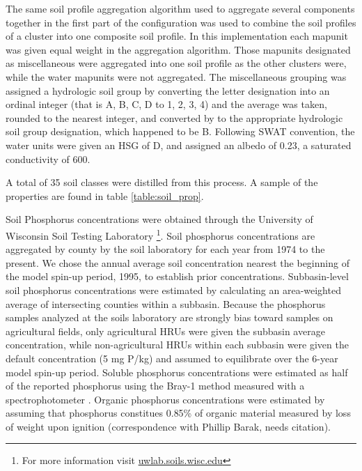 The same soil profile aggregation algorithm \citep{beaudette_algorithms_2013} used to aggregate several components together in the first part of the configuration was used to combine the soil profiles of a cluster into one composite soil profile. In this implementation each mapunit was given equal weight in the aggregation algorithm. Those mapunits designated as miscellaneous were aggregated into one soil profile as the other clusters were, while the water mapunits were not aggregated. The miscellaneous  grouping was assigned a hydrologic soil group by converting the letter designation into an ordinal integer (that is A, B, C, D to 1, 2, 3, 4) and the average was taken, rounded to the nearest integer, and converted by to the appropriate hydrologic soil group designation, which happened to be B. Following SWAT convention, the water units were given an HSG of D, and assigned an albedo of 0.23, a saturated conductivity of 600.

A total of 35 soil classes were distilled from this process. A sample of the properties are found in table \ref{table:soil_prop}.


Soil Phosphorus concentrations were obtained through the University of Wisconsin Soil Testing Laboratory \footnote{For more information visit \href{http://uwlab.soils.wisc.edu/}{uwlab.soils.wisc.edu}}. Soil phosphorus concentrations are aggregated by county by the soil laboratory for each year from 1974 to the present. We chose the annual average soil concentration nearest the beginning of the model spin-up period, 1995, to establish prior concentrations. Subbasin-level soil phosphorus concentrations were estimated by calculating an area-weighted average of intersecting counties within a subbasin. Because the phosphorus samples analyzed at the soils laboratory are strongly bias toward samples on agricultural fields, only agricultural HRUs were given the subbasin average concentration, while non-agricultural HRUs within each subbasin were given the default concentration (5 mg P/kg) and assumed to equilibrate over the 6-year model spin-up period. Soluble phosphorus concentrations were estimated as half of the reported phosphorus using the Bray-1 method measured with a spectrophotometer \citep{vadas_validating_2010}. Organic phosphorus concentrations were estimated by assuming that phosphorus constitues 0.85\% of organic material measured by loss of weight upon ignition (correspondence with Phillip Barak, needs citation).
